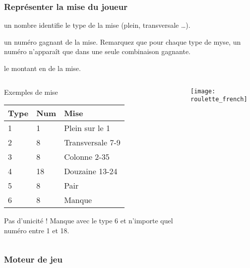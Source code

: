 \documentclass[10pt]{beamer}
\begin{document}
\begin{frame}
  \frametitle{Représenter la mise du joueur}
  \begin{description}[Montant]
  \item[Type] un nombre identifie le type de la mise (plein, transversale \dots).
  \item[Numéro] un numéro gagnant de la mise. Remarquez que pour chaque type de myse, un numéro n'apparaît que dans une seule combinaison gagnante.
  \item[Montant] le montant en de la mise.
  \end{description}

  
\begin{columns}[c]
\begin{column}{0.58\textwidth}
  \begin{exampleblock}{Exemples de mise}
  \end{exampleblock}
  \begin{tabular}{lll}
    \toprule
    Type & Num & Mise             \\
    \midrule
    1    & 1   & Plein sur le 1   \\
    2    & 8   & Transversale 7-9 \\
    3    & 8   & Colonne 2-35     \\
    4    & 18  & Douzaine 13-24   \\
    5    & 8   & Pair             \\
    6    & 8   & Manque           \\
    \bottomrule
  \end{tabular}
  \begin{alertblock}{Pas d'unicité !}
    Manque avec le type 6 et n'importe quel numéro entre 1 et 18.
  \end{alertblock}
  \end{column}
\begin{column}{0.42\textwidth}
    \texttt{[image: roulette\_french]}
  \end{column}
\end{columns}

\end{frame}


\begin{frame}[fragile]
  \frametitle{Moteur de jeu}
  
\end{frame}
\end{document}
